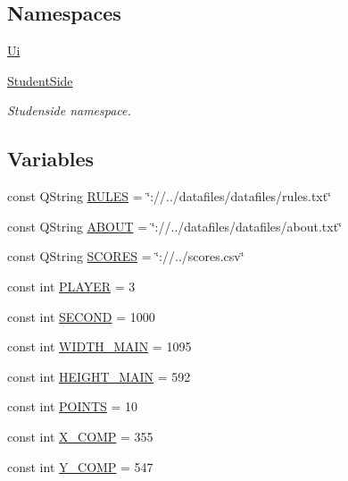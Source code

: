 \subsection*{Namespaces}
\begin{DoxyCompactItemize}
\item 
\hyperlink{namespace_ui}{Ui}
\item 
\hyperlink{namespace_student_side}{Student\-Side}
\begin{DoxyCompactList}\small\item\em Studenside namespace. \end{DoxyCompactList}\end{DoxyCompactItemize}
\subsection*{Variables}
\begin{DoxyCompactItemize}
\item 
const Q\-String \hyperlink{mainwindow_8hh_afad7eb5ce267412e261321798f276542}{R\-U\-L\-E\-S} = \char`\"{}\-://../datafiles/datafiles/rules.\-txt\char`\"{}
\item 
const Q\-String \hyperlink{mainwindow_8hh_add086dddfd1041a943afc24d4fc5217e}{A\-B\-O\-U\-T} = \char`\"{}\-://../datafiles/datafiles/about.\-txt\char`\"{}
\item 
const Q\-String \hyperlink{mainwindow_8hh_a0012746528a3f7abc7de472e05a9e30c}{S\-C\-O\-R\-E\-S} = \char`\"{}\-://../scores.\-csv\char`\"{}
\item 
const int \hyperlink{mainwindow_8hh_ad18a55885568d3324c55bdefa31112ba}{P\-L\-A\-Y\-E\-R} = 3
\item 
const int \hyperlink{mainwindow_8hh_a50077804d4a057181d4f05a294a15ca1}{S\-E\-C\-O\-N\-D} = 1000
\item 
const int \hyperlink{mainwindow_8hh_a119c8f137ad0941c9930319665d01abb}{W\-I\-D\-T\-H\-\_\-\-M\-A\-I\-N} = 1095
\item 
const int \hyperlink{mainwindow_8hh_a8a9a3d327e245d16d8af8d57ac0428fc}{H\-E\-I\-G\-H\-T\-\_\-\-M\-A\-I\-N} = 592
\item 
const int \hyperlink{mainwindow_8hh_adf877364b47d0f0beade7967f248355c}{P\-O\-I\-N\-T\-S} = 10
\item 
const int \hyperlink{mainwindow_8hh_a01bc9f3900a2569418be75ff477c6462}{X\-\_\-\-C\-O\-M\-P} = 355
\item 
const int \hyperlink{mainwindow_8hh_a33040b291915efa0c17ff1a72a00a119}{Y\-\_\-\-C\-O\-M\-P} = 547
\end{DoxyCompactItemize}


